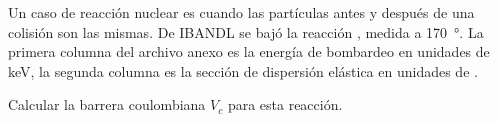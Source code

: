 \documentclass[./../main.tex]{subfiles}
\begin{document}
    Un caso de reacción nuclear es cuando las partículas antes y después de una colisión son las mismas. De IBANDL se bajó la reacción , medida a \SI{170}{\degree}. La primera columna del archivo anexo es la energía de bombardeo en unidades de \unit{\keV}, la segunda columna es la sección de dispersión elástica en unidades de \unit{\mb}.

    \begin{exercise}
        Calcular la barrera coulombiana \(V_{c}\) para esta reacción.
    \end{exercise}
\end{document}

